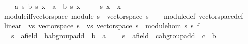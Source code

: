 \begin{isabellebody}
\ \ \ \ {\isachardoublequoteopen}a\ {\isacharasterisk}{\kern0pt}s\ {\isacharparenleft}{\kern0pt}b\ {\isacharasterisk}{\kern0pt}s\ x{\isacharparenright}{\kern0pt}\ {\isacharequal}{\kern0pt}\ {\isacharparenleft}{\kern0pt}a\ {\isacharasterisk}{\kern0pt}\ b{\isacharparenright}{\kern0pt}\ {\isacharasterisk}{\kern0pt}s\ x{\isachardoublequoteclose}\isanewline
\ \ \ \ {\isachardoublequoteopen}{}\ {\isacharasterisk}{\kern0pt}s\ x\ {\isacharequal}{\kern0pt}\ x{\isachardoublequoteclose}\isanewline
\isanewline
{}\isamarkupfalse%
\ module{\isacharunderscore}{\kern0pt}iff{\isacharunderscore}{\kern0pt}vector{\isacharunderscore}{\kern0pt}space{\isacharcolon}{\kern0pt}\ {\isachardoublequoteopen}module\ s\ {\isasymlongleftrightarrow}\ vector{\isacharunderscore}{\kern0pt}space\ s{\isachardoublequoteclose}\isanewline
%
\isadelimproof
\ \ %
\endisadelimproof
%
\isatagproof
{}\isamarkupfalse%
\ module{\isacharunderscore}{\kern0pt}def\ vector{\isacharunderscore}{\kern0pt}space{\isacharunderscore}{\kern0pt}def\ \isacommand{{\isachardot}{\kern0pt}{\isachardot}{\kern0pt}}\isamarkupfalse%
%
\endisatagproof
{\isafoldproof}%
%
\isadelimproof
\isanewline
%
\endisadelimproof
\isanewline
{}\isamarkupfalse%
\ linear\ {\isacharequal}{\kern0pt}\ vs{}{\isacharcolon}{\kern0pt}\ vector{\isacharunderscore}{\kern0pt}space\ s{}\ {\isacharplus}{\kern0pt}\ vs{}{\isacharcolon}{\kern0pt}\ vector{\isacharunderscore}{\kern0pt}space\ s{}\ {\isacharplus}{\kern0pt}\ module{\isacharunderscore}{\kern0pt}hom\ s{}\ s{}\ f\isanewline
\ \ \ s{}\ {\isacharcolon}{\kern0pt}{\isacharcolon}{\kern0pt}\ {\isachardoublequoteopen}{\isacharprime}{\kern0pt}a{\isacharcolon}{\kern0pt}{\isacharcolon}{\kern0pt}field\ {\isasymRightarrow}\ {\isacharprime}{\kern0pt}b{\isacharcolon}{\kern0pt}{\isacharcolon}{\kern0pt}ab{\isacharunderscore}{\kern0pt}group{\isacharunderscore}{\kern0pt}add\ {\isasymRightarrow}\ {\isacharprime}{\kern0pt}b{\isachardoublequoteclose}\ {\isacharparenleft}{\kern0pt}\ {\isachardoublequoteopen}{\isacharasterisk}{\kern0pt}a{\isachardoublequoteclose}\ {}{}{\isacharparenright}{\kern0pt}\isanewline
\ \ \ s{}\ {\isacharcolon}{\kern0pt}{\isacharcolon}{\kern0pt}\ {\isachardoublequoteopen}{\isacharprime}{\kern0pt}a{\isacharcolon}{\kern0pt}{\isacharcolon}{\kern0pt}field\ {\isasymRightarrow}\ {\isacharprime}{\kern0pt}c{\isacharcolon}{\kern0pt}{\isacharcolon}{\kern0pt}ab{\isacharunderscore}{\kern0pt}group{\isacharunderscore}{\kern0pt}add\ {\isasymRightarrow}\ {\isacharprime}{\kern0pt}c{\isachardoublequoteclose}\ {\isacharparenleft}{\kern0pt}\ {\isachardoublequoteopen}{\isacharasterisk}{\kern0pt}b{\isachardoublequoteclose}\ {}{}{\isacharparenright}{\kern0pt}\isanewline

\end{isabellebody}
